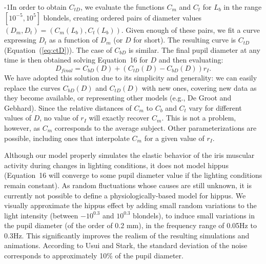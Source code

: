 \documentclass{dnacm} %
\begin{document}
\looseness-1In order to obtain $C_{tD}$, we evaluate the functions $C_m$
and $C_t$ for $L_b$ in the range $[10^{-5}, 10^5]$ blondels, creating
ordered pairs of diameter values $(D_m, D_t) = (C_m(L_b), C_t(L_b))$.
Given enough of these pairs, we fit a curve expressing $D_t$ as a
function of $D_m$ (or $D$ for short). The resulting curve is $C_{tD}$
(Equation~(\ref{eq:ctD})). The case of $C_{bD}$ is similar. The final
pupil diameter at any time is then obtained solving Equation~16 for $D$
and then evaluating:
\begin{equation}
\label{eq:isocurve}
D_{final} = C_{bD}(D) + (C_{tD}(D) - C_{bD}(D)) r_I.
\end{equation}
We have adopted this solution due to its simplicity and generality: we
can easily replace the curves $C_{bD}(D)$ and $C_{tD}(D)$ with new ones,
covering new data as they become available, or representing other models
(e.g., De Groot and Gebhard). Since the relative distances of $C_m$ to
$C_b$ and $C_t$ vary for different values of $D$, no value of $r_I$ will
exactly recover $C_m$. This is not a problem, however, as $C_m$
corresponds to the average subject. Other parameterizations are
possible, including ones that interpolate $C_m$ for a given value of
$r_I$.

Although our model properly simulates the elastic behavior of the iris
muscular activity during changes in lighting conditions, it does not
model hippus (Equation~16 will converge to some pupil diameter value if
the lighting conditions remain constant). As random fluctuations whose
causes are still unknown, it is currently not possible to define a
physiologically-based model for hippus. We visually approximate the
hippus effect by adding small random variations to the light intensity
(between $-10^{0.3}$ and $10^{0.3}$ blondels), to induce small
variations in the pupil diameter (of the order of 0.2 mm), in the
frequency range of 0.05Hz to 0.3Hz. This significantly improves the
realism of the resulting simulations and animations. According to Usui
and Stark, the standard deviation of the noise corresponds to
approximately 10\% of the pupil diameter.
\end{document}
